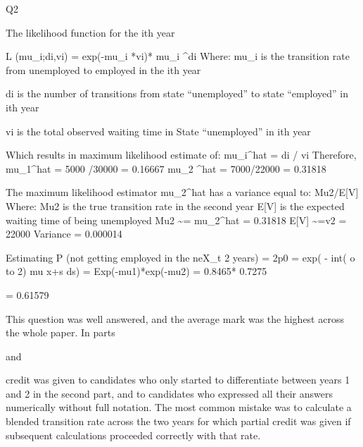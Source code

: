 Q2
\item  
The likelihood function for the ith year \item 
L (mu_i;di,vi) = exp(-mu_i *vi)* mu_i ^di 
Where:
mu_i is the transition rate from unemployed to employed in the ith year \item 
\medskip 
di is the number of transitions from state “unemployed” to state “employed”
in ith year \item 
vi is the total observed waiting time in State “unemployed” in ith year \item 
\item  
Which results in maximum likelihood estimate of:
mu_i^hat = di / vi
Therefore,
mu_1^hat = 5000 /30000 = 0.16667 
mu_2 ^hat = 7000/22000 = 0.31818 
\item 
The maximum likelihood estimator mu_2^hat has a variance equal to:
Mu2/E[V] 
Where:
Mu2 is the true transition rate in the second year
E[V] is the expected waiting time of being unemployed
Mu2 \sim = mu_2^hat = 0.31818
E[V] \sim =v2 = 22000 
Variance = 0.000014 
\item 
Estimating
P (not getting employed in the neX_{t} 2 years) = 2p0 = exp( - int( o to 2) mu x+s ds) 
= Exp(-mu1)*exp(-mu2) 
= 0.8465* 0.7275 \item 
= 0.61579 \item 

This question was well answered, and the average mark was the highest across the whole paper.
In parts \item   and \item   credit was given to candidates who only started to differentiate between years 1 and 2 in the second part, and to candidates who expressed all their answers numerically without full notation. The most common mistake was to calculate a blended transition rate across the two years for which partial credit was given if subsequent calculations proceeded correctly with that rate.
